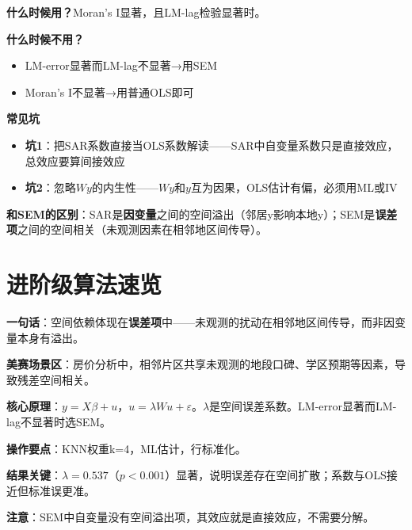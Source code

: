 \begin{algonotes}
\textbf{什么时候用？}Moran's I显著，且LM-lag检验显著时。

\textbf{什么时候不用？}
\begin{itemize}
    \item LM-error显著而LM-lag不显著→用SEM
    \item Moran's I不显著→用普通OLS即可
\end{itemize}

\textbf{常见坑}
\begin{itemize}
    \item \textbf{坑1}：把SAR系数直接当OLS系数解读——SAR中自变量系数只是直接效应，总效应要算间接效应
    \item \textbf{坑2}：忽略$Wy$的内生性——$Wy$和$y$互为因果，OLS估计有偏，必须用ML或IV
\end{itemize}

\textbf{和SEM的区别}：SAR是\textbf{因变量}之间的空间溢出（邻居y影响本地y）；SEM是\textbf{误差项}之间的空间相关（未观测因素在相邻地区间传导）。
\end{algonotes}

\section{进阶级算法速览}


\begin{algobrief}
\textbf{一句话}：空间依赖体现在\textbf{误差项}中——未观测的扰动在相邻地区间传导，而非因变量本身有溢出。

\textbf{美赛场景区}：房价分析中，相邻片区共享未观测的地段口碑、学区预期等因素，导致残差空间相关。

\textbf{核心原理}：$y=X\beta+u$，$u=\lambda Wu+\varepsilon$。$\lambda$是空间误差系数。LM-error显著而LM-lag不显著时选SEM。

\textbf{操作要点}：KNN权重k=4，ML估计，行标准化。

\textbf{结果关键}：$\lambda=0.537$（$p<0.001$）显著，说明误差存在空间扩散；系数与OLS接近但标准误更准。

\textbf{注意}：SEM中自变量没有空间溢出项，其效应就是直接效应，不需要分解。
\end{algobrief}


